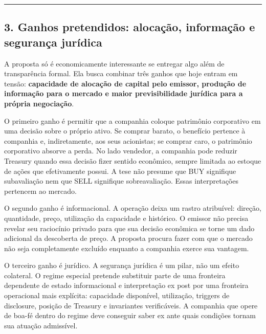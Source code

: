 \documentclass[
  a4paper,
]{article}
\begin{document}
\begin{center}\rule{0.5\linewidth}{0.5pt}\end{center}

\hypertarget{3-ganhos-pretendidos-alocacao-informacao-e-seguranca-juridica}{}

\hypertarget{3-ganhos-pretendidos-alocauxe7uxe3o-informauxe7uxe3o-e-seguranuxe7a-juruxeddica}{%
\subsection{3. Ganhos pretendidos: alocação, informação e segurança
jurídica}\label{3-ganhos-pretendidos-alocauxe7uxe3o-informauxe7uxe3o-e-seguranuxe7a-juruxeddica}}

A proposta só é economicamente interessante se entregar algo além de
transparência formal. Ela busca combinar três ganhos que hoje entram em
tensão: \textbf{capacidade de alocação de capital pelo emissor, produção
de informação para o mercado e maior previsibilidade jurídica para a
própria negociação}.

O primeiro ganho é permitir que a companhia coloque patrimônio
corporativo em uma decisão sobre o próprio ativo. Se comprar barato, o
benefício pertence à companhia e, indiretamente, aos seus acionistas; se
comprar caro, o patrimônio corporativo absorve a perda. No lado
vendedor, a companhia pode reduzir Treasury quando essa decisão fizer
sentido econômico, sempre limitada ao estoque de ações que efetivamente
possui. A tese não presume que BUY signifique subavaliação nem que SELL
signifique sobreavaliação. Essas interpretações pertencem ao mercado.

O segundo ganho é informacional. A operação deixa um rastro atribuível:
direção, quantidade, preço, utilização da capacidade e histórico. O
emissor não precisa revelar seu raciocínio privado para que sua decisão
econômica se torne um dado adicional da descoberta de preço. A proposta
procura fazer com que o mercado não seja completamente excluído enquanto
a companhia exerce sua vantagem.

O terceiro ganho é jurídico. A segurança jurídica é um pilar, não um
efeito colateral. O regime especial pretende substituir parte de uma
fronteira dependente de estado informacional e interpretação ex post por
uma fronteira operacional mais explícita: capacidade disponível,
utilização, triggers de disclosure, posição de Treasury e invariantes
verificáveis. A companhia que opere de boa-fé dentro do regime deve
conseguir saber ex ante quais condições tornam sua atuação admissível.
\end{document}
